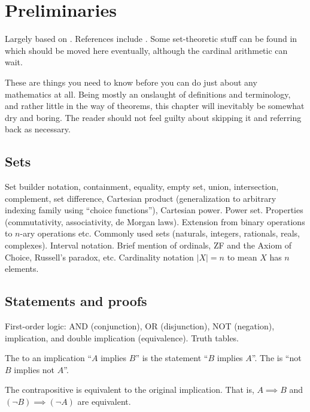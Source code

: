 \section{Preliminaries}

Largely based on \cite{redpill}. References include \cite{Kapl,Aluf,PM145}. Some set-theoretic stuff can be found in \cite[\S 1]{PM351} which should be moved here eventually, although the cardinal arithmetic can wait.

These are things you need to know before you can do just about any mathematics at all. Being mostly an onslaught of definitions and terminology, and rather little in the way of theorems, this chapter will inevitably be somewhat dry and boring. The reader should not feel guilty about skipping it and referring back as necessary.

\subsection{Sets}

Set builder notation, containment, equality, empty set, union, intersection, complement, set difference, Cartesian product (generalization to arbitrary indexing family using ``choice functions''), Cartesian power. Power set. Properties (commutativity, associativity, de Morgan laws). Extension from binary operations to $n$-ary operations etc. Commonly used sets (naturals, integers, rationals, reals, complexes). Interval notation. Brief mention of ordinals, ZF and the Axiom of Choice, Russell's paradox, etc. Cardinality notation $|X| = n$ to mean $X$ has $n$ elements.

\subsection{Statements and proofs}

First-order logic: AND (conjunction), OR (disjunction), NOT (negation), implication, and double implication (equivalence). Truth tables.

\begin{definition}
The  to an implication ``$A$ implies $B$'' is the statement ``$B$ implies $A$''. The  is ``not $B$ implies not $A$''.
\end{definition}

\begin{exercise}
The contrapositive is equivalent to the original implication. That is, $A \implies B$ and $(\lnot B) \implies (\lnot A)$ are equivalent.
\end{exercise}

